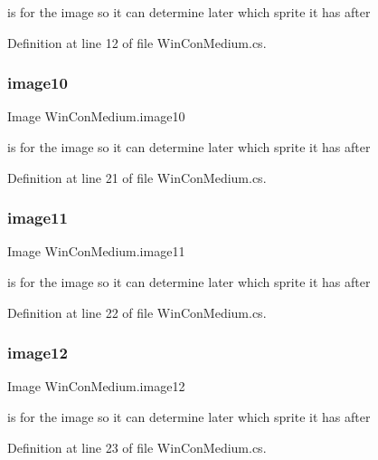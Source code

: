 is for the image so it can determine later which sprite it has after 

Definition at line 12 of file Win\+Con\+Medium.\+cs.

\mbox{\label{class_win_con_medium_abb39cbeb938f26064e0d91424ea5e5cd}} 
\subsubsection{\texorpdfstring{image10}{image10}}
{\footnotesize\ttfamily Image Win\+Con\+Medium.\+image10}

is for the image so it can determine later which sprite it has after 

Definition at line 21 of file Win\+Con\+Medium.\+cs.

\mbox{\label{class_win_con_medium_a1b31433af8b4fd506ed34b75622dc4e6}} 
\subsubsection{\texorpdfstring{image11}{image11}}
{\footnotesize\ttfamily Image Win\+Con\+Medium.\+image11}

is for the image so it can determine later which sprite it has after 

Definition at line 22 of file Win\+Con\+Medium.\+cs.

\mbox{\label{class_win_con_medium_a1820e4719561520f0985eb0fb63106ec}} 
\subsubsection{\texorpdfstring{image12}{image12}}
{\footnotesize\ttfamily Image Win\+Con\+Medium.\+image12}

is for the image so it can determine later which sprite it has after 

Definition at line 23 of file Win\+Con\+Medium.\+cs.

\mbox{\label{class_win_con_medium_ae8c1c1ff34a1610bc95a60639b2c7519}} 
